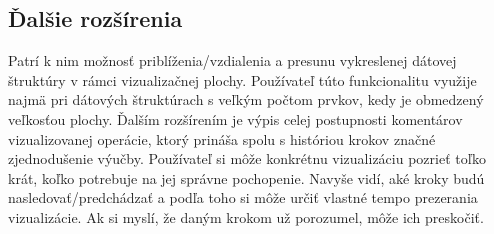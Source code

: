 \subsection{Ďalšie rozšírenia}
Patrí k nim
možnosť priblíženia/vzdialenia a presunu vykreslenej dátovej štruktúry v rámci
vizualizačnej plochy. Používateľ túto funkcionalitu využije najmä pri dátových
štruktúrach s veľkým počtom prvkov, kedy je obmedzený veľkosťou plochy. Ďalším
rozšírením je výpis celej postupnosti komentárov vizualizovanej operácie,
ktorý prináša spolu s históriou krokov značné zjednodušenie
výučby. Používateľ si môže konkrétnu vizualizáciu pozrieť toľko krát, koľko
potrebuje na jej správne pochopenie. Navyše vidí, aké kroky budú
nasledovať/predchádzať a podľa toho si môže určiť vlastné tempo prezerania
vizualizácie. Ak si myslí, že daným krokom už porozumel, môže ich preskočiť.

